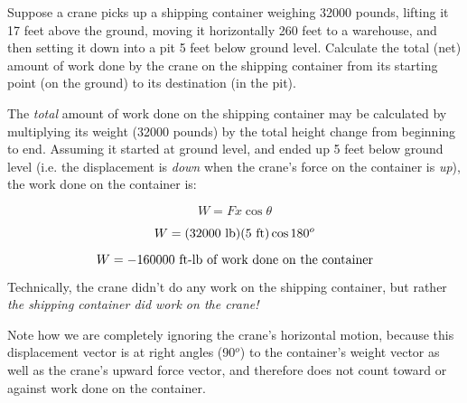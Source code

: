 

Suppose a crane picks up a shipping container weighing 32000 pounds, lifting it 17 feet above the ground, moving it horizontally 260 feet to a warehouse, and then setting it down into a pit 5 feet below ground level.  Calculate the total (net) amount of work done by the crane on the shipping container from its starting point (on the ground) to its destination (in the pit).







The {\it total} amount of work done on the shipping container may be calculated by multiplying its weight (32000 pounds) by the total height change from beginning to end.  Assuming it started at ground level, and ended up 5 feet below ground level (i.e. the displacement is {\it down} when the crane's force on the container is {\it up}), the work done on the container is:

$$W = F x \cos \theta$$

$$W = (32000 \hbox{ lb}) (5 \hbox{ ft}) \cos 180^o$$

$$W = -160000 \hbox{ ft-lb of work done on the container}$$

Technically, the crane didn't do any work on the shipping container, but rather {\it the shipping container did work on the crane!}

\vskip 10pt

Note how we are completely ignoring the crane's horizontal motion, because this displacement vector is at right angles (90$^{o}$) to the container's weight vector as well as the crane's upward force vector, and therefore does not count toward or against work done on the container.











